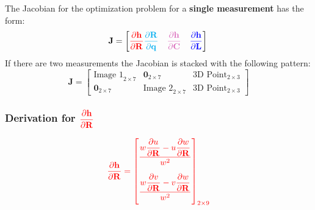 \documentclass{article}
\renewcommand{\Vec}[1]{{\mathbf{#1}}}
\newcommand{\Mat}[1]{{\mathbf{#1}}}
\newcommand{\Zeros}[2]{{\Vec{0}_{#1\times#2}}}
\newcommand{\quat}{{\Vec{q}}}
\newcommand{\jac}{{\Mat{J}}}
\newcommand{\camRot}{{\Vec{R}}}
\newcommand{\camPos}{{\Vec{C}}}
\newcommand{\landmarkPos}{{\Vec{L}}}
\newcommand{\projFunc}{{\Vec{h}}}
\begin{document}
The Jacobian for the optimization problem for a \textbf{single measurement} has
the form:
%
\begin{equation}
  \jac = \begin{bmatrix}
    \color{red}
    \dfrac{\partial{\projFunc}}{\partial \camRot}
    \color{cyan}
    \dfrac{\partial{\camRot}}{\partial{\quat}} \quad
    \color{Thistle}
    \dfrac{\partial{\projFunc}}{\partial \camPos} \quad
    \color{blue}
    \dfrac{\partial{\projFunc}}{\partial \landmarkPos}
  \end{bmatrix} \\
\end{equation}
%
If there are two measurements the Jacobian is stacked with the following
pattern:
%
\begin{equation}
  \jac = \begin{bmatrix}
    \text{Image 1}_{2 \times 7}
      & \Zeros{2}{7}
      & \text{3D Point}_{2 \times 3} \\
    \Zeros{2}{7}
      & \text{Image 2}_{2 \times 7}
      & \text{3D Point}_{2 \times 3}
  \end{bmatrix}
\end{equation}


\subsubsection*{Derivation for 
$\color{red}
\dfrac{\partial{\projFunc}}{\partial{\camRot}}$}

\begin{align}
  \color{red}
  \dfrac{\partial{\projFunc}}{\partial{\camRot}} =
  \begin{bmatrix}
    \dfrac{
      w \dfrac{\partial{u}}{\partial{\camRot}} -
      u \dfrac{\partial{w}}{\partial{\camRot}}
    }{w^{2}} \vspace{1.0em} \\
    \dfrac{
      w \dfrac{\partial{v}}{\partial{\camRot}} -
      v \dfrac{\partial{w}}{\partial{\camRot}}
    }{w^{2}} \vspace{0.5em}
  \end{bmatrix}_{2 \times 9}
\end{align}
\end{document}
